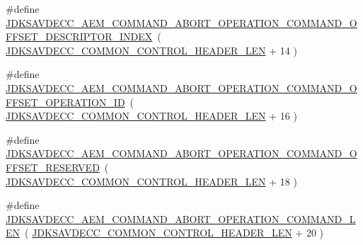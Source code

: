\begin{DoxyCompactItemize}
\#define \hyperlink{group__command__abort__operation_ga5b37c8e92206b2f87cb2fa8b68deac70}{J\+D\+K\+S\+A\+V\+D\+E\+C\+C\+\_\+\+A\+E\+M\+\_\+\+C\+O\+M\+M\+A\+N\+D\+\_\+\+A\+B\+O\+R\+T\+\_\+\+O\+P\+E\+R\+A\+T\+I\+O\+N\+\_\+\+C\+O\+M\+M\+A\+N\+D\+\_\+\+O\+F\+F\+S\+E\+T\+\_\+\+D\+E\+S\+C\+R\+I\+P\+T\+O\+R\+\_\+\+I\+N\+D\+EX}~( \hyperlink{group__jdksavdecc__avtp__common__control__header_gaae84052886fb1bb42f3bc5f85b741dff}{J\+D\+K\+S\+A\+V\+D\+E\+C\+C\+\_\+\+C\+O\+M\+M\+O\+N\+\_\+\+C\+O\+N\+T\+R\+O\+L\+\_\+\+H\+E\+A\+D\+E\+R\+\_\+\+L\+EN} + 14 )
\item 
\#define \hyperlink{group__command__abort__operation_gaf3ce5ba24829b27b7ce98a52928a685c}{J\+D\+K\+S\+A\+V\+D\+E\+C\+C\+\_\+\+A\+E\+M\+\_\+\+C\+O\+M\+M\+A\+N\+D\+\_\+\+A\+B\+O\+R\+T\+\_\+\+O\+P\+E\+R\+A\+T\+I\+O\+N\+\_\+\+C\+O\+M\+M\+A\+N\+D\+\_\+\+O\+F\+F\+S\+E\+T\+\_\+\+O\+P\+E\+R\+A\+T\+I\+O\+N\+\_\+\+ID}~( \hyperlink{group__jdksavdecc__avtp__common__control__header_gaae84052886fb1bb42f3bc5f85b741dff}{J\+D\+K\+S\+A\+V\+D\+E\+C\+C\+\_\+\+C\+O\+M\+M\+O\+N\+\_\+\+C\+O\+N\+T\+R\+O\+L\+\_\+\+H\+E\+A\+D\+E\+R\+\_\+\+L\+EN} + 16 )
\item 
\#define \hyperlink{group__command__abort__operation_ga7a40ba41de97c70084670aac42863846}{J\+D\+K\+S\+A\+V\+D\+E\+C\+C\+\_\+\+A\+E\+M\+\_\+\+C\+O\+M\+M\+A\+N\+D\+\_\+\+A\+B\+O\+R\+T\+\_\+\+O\+P\+E\+R\+A\+T\+I\+O\+N\+\_\+\+C\+O\+M\+M\+A\+N\+D\+\_\+\+O\+F\+F\+S\+E\+T\+\_\+\+R\+E\+S\+E\+R\+V\+ED}~( \hyperlink{group__jdksavdecc__avtp__common__control__header_gaae84052886fb1bb42f3bc5f85b741dff}{J\+D\+K\+S\+A\+V\+D\+E\+C\+C\+\_\+\+C\+O\+M\+M\+O\+N\+\_\+\+C\+O\+N\+T\+R\+O\+L\+\_\+\+H\+E\+A\+D\+E\+R\+\_\+\+L\+EN} + 18 )
\item 
\#define \hyperlink{group__command__abort__operation_gad04337d4978332b9e6fae7ce4a6dff97}{J\+D\+K\+S\+A\+V\+D\+E\+C\+C\+\_\+\+A\+E\+M\+\_\+\+C\+O\+M\+M\+A\+N\+D\+\_\+\+A\+B\+O\+R\+T\+\_\+\+O\+P\+E\+R\+A\+T\+I\+O\+N\+\_\+\+C\+O\+M\+M\+A\+N\+D\+\_\+\+L\+EN}~( \hyperlink{group__jdksavdecc__avtp__common__control__header_gaae84052886fb1bb42f3bc5f85b741dff}{J\+D\+K\+S\+A\+V\+D\+E\+C\+C\+\_\+\+C\+O\+M\+M\+O\+N\+\_\+\+C\+O\+N\+T\+R\+O\+L\+\_\+\+H\+E\+A\+D\+E\+R\+\_\+\+L\+EN} + 20 )
\end{DoxyCompactItemize}

